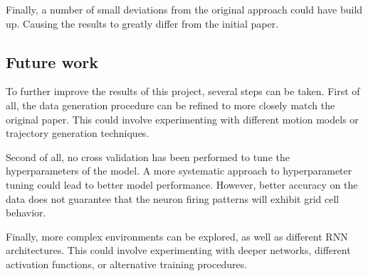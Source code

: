\documentclass{article}
\begin{document}
Finally, a number of small deviations from the original approach could have build up. Causing the results to greatly differ from the initial paper.

\subsection{Future work}
To further improve the results of this project, several steps can be taken. First of all, the data generation procedure can be refined to more closely match the original paper. This could involve experimenting with different motion models or trajectory generation techniques. 

Second of all, no cross validation has been performed to tune the hyperparameters of the model. A more systematic approach to hyperparameter tuning could lead to better model performance. However, better accuracy on the data does not guarantee that the neuron firing patterns will exhibit grid cell behavior. 

Finally, more complex environments can be explored, as well as different RNN architectures. This could involve experimenting with deeper networks, different activation functions, or alternative training procedures.











\end{document}
